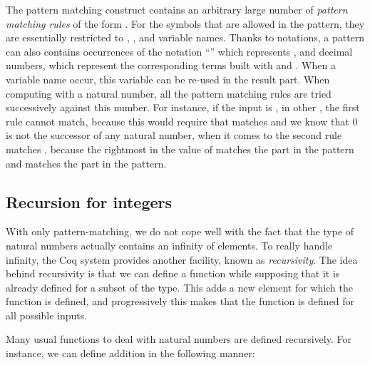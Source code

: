 The pattern matching construct 
contains an arbitrary large number of {\em pattern matching rules} of
the form .  For the symbols that are allowed
in the pattern, they are essentially restricted to , , and
variable names.  Thanks to notations, a pattern can also contains
occurrences of the notation ``'' which represents , and
decimal numbers, which represent the corresponding terms built with
 and .  When a variable name occur, this variable can be
re-used in the result part.  When computing with a natural number, all
the pattern matching rules are tried successively against this number.
For instance, if the input is , in other , the first
rule cannot match, because this would require that  matches
 and we know that \(0\) is not the successor of any
natural number, when it comes to the second rule  matches
, because the rightmost  in the value of  matches
the  part in the pattern and  matches the  part in
the pattern.

\subsection{Recursion for integers}
With only pattern-matching, we do not cope well with the fact that the
type  of natural numbers actually contains an infinity of
elements.  To really handle infinity, the Coq system provides another
facility, known as {\em recursivity}.  The idea behind recursivity is
that we can define a function while supposing that it is already
defined for a subset of the type.  This adds a new element for which
the function is defined, and progressively this makes that the
function is defined for all possible inputs.

Many usual functions to deal with natural numbers are
defined recursively.  For instance, we can define addition in the
following manner:

